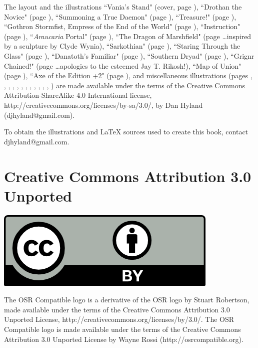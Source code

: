 \begin{multicols}{2}
\noindent The layout and the illustrations ``Vania's Stand" (cover, page \pageref{insidecover}), ``Drothan the Novice" (page \pageref{drothanthenovice}), ``Summoning a True Daemon" (page \pageref{truedaemon}), ``Treasure!" (page \pageref{dwarfnelf}), ``Gothron Stormfist, Empress of the End of the World" (page \pageref{gothron}), ``Instruction" (page \pageref{instruction}), ``\textit{Araucaria} Portal" (page \pageref{araucariaportal}), ``The Dragon of Marshfield" (page \pageref{marshfield}\ldots inspired by a sculpture by Clyde Wynia), ``Sarkothian" (page \pageref{sarkothian}), ``Staring Through the Glass" (page \pageref{throughtheglass}), ``Danatoth's Familiar" (page \pageref{fiona}), ``Southern Dryad" (page \pageref{southerndryad}), ``Grignr Chained!" (page \pageref{grignrchained}\ldots apologies to the esteemed Jay T. Rikosh!), ``Map of Union" (page \pageref{unionmap}), ``Axe of the Edition +2" (page \pageref{axe2e}), and miscellaneous illustrations (pages \pageref{bastardsword}, \pageref{bittermead}, \pageref{vikingship}, \pageref{knock}, \pageref{lightningbolt}, \pageref{symbol}, \pageref{vials}, \pageref{vacuous}, \pageref{alchemy}, \pageref{bagofholding}, \pageref{sphereofannihilation}, \pageref{vikingsword}, \pageref{willowisp}) are made available under the terms of the Creative Commons Attribution-ShareAlike 4.0 International license, http://creativecommons.org/licenses/by-sa/3.0/, by Dan Hyland (djhyland@gmail.com).

To obtain the illustrations and \LaTeX{} sources used to create this book, contact djhyland@gmail.com.

\section{Creative Commons Attribution 3.0 Unported}

\begin{center}
\noindent \includegraphics{by.png}
\end{center}

\noindent The OSR Compatible logo is a derivative of the OSR logo by Stuart Robertson, made available under the terms of the Creative Commons Attribution 3.0 Unported License, http://creativecommons.org/licenses/by/3.0/. The OSR Compatible logo is made available under the terms of the Creative Commons Attribution 3.0 Unported License by Wayne Rossi (http://osrcompatible.org). 

\end{multicols}
